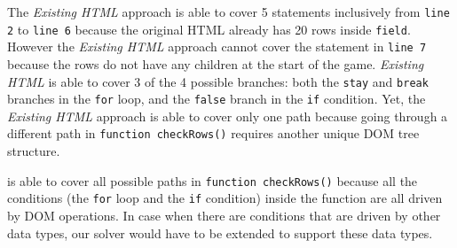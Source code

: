 The {\em Existing HTML} approach is able to cover 5 statements inclusively from {\tt line 2} to {\tt line 6} because the original HTML already has 20 rows inside {\tt field}.  
However the {\em Existing HTML} approach cannot cover the statement in {\tt line 7} because the rows do not have any children at the start of the game. 
{\em Existing HTML} is able to cover 3 of the 4 possible branches: both the {\tt stay} and {\tt break} branches in the {\tt for} loop, and the {\tt false} branch in the {\tt if} condition. 
Yet, the {\em Existing HTML} approach is able to cover only one path because going through a different path in {\tt function checkRows()} requires another unique DOM tree structure.  

\tool is able to cover all possible paths in {\tt function checkRows()} because all the conditions (the {\tt for} loop and the {\tt if} condition) inside the function are all driven by DOM operations.  
In case when there are conditions that are driven by other data types, our solver would have to be extended to support these data types.    
